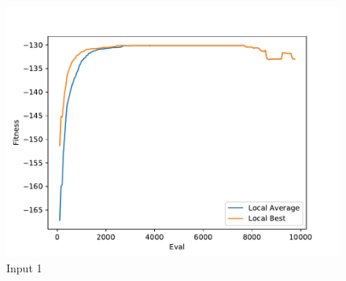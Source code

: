 \documentclass{standalone}
\begin{document}
\begin{figure}[!htb]
	\caption{Input 1}
	\label{fig:graph_1071}
	\includegraphics[width=\textwidth]{../graphs/graphs/1071.pdf}
\end{figure}
\end{document}
